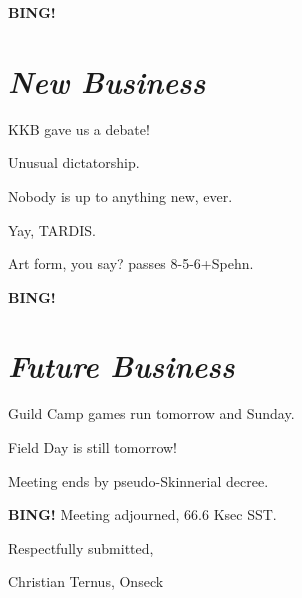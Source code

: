 \documentclass[10pt]{article}
\newcommand{\bing}{{\bf BING!} }
\newcommand{\goto}[1]{\bing \vskip 12pt \section*{{\em{#1}}}}
\begin{document}
\goto{New Business}

KKB gave us a debate!

Unusual dictatorship.

Nobody is up to anything new, ever.

Yay, TARDIS.

Art form, you say?  passes 8-5-6+Spehn.

\goto{Future Business}

Guild Camp games run tomorrow and Sunday.

Field Day is still tomorrow!

Meeting ends by pseudo-Skinnerial decree.

\bing
\noindent
Meeting adjourned, 66.6 Ksec SST.

\vspace{18pt}

\centerline{Respectfully submitted,}
\centerline{Christian Ternus, Onseck}
\end{document}
